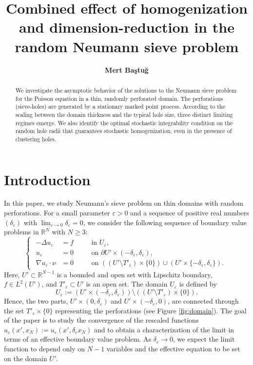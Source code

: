 \documentclass{article}
\title{\textbf{Combined effect of homogenization and dimension-reduction in the random Neumann sieve problem}}
\author{\textbf{Mert Baştuğ}}
\date{}
\numberwithin{equation}{section}
\theoremstyle{definition}
\theoremstyle{remark}
\begin{document}
\maketitle

\begin{abstract}
    We investigate the asymptotic behavior of the solutions to the Neumann sieve problem for the Poisson equation in a thin, randomly perforated domain. The perforations (sieve-holes) are generated by a stationary marked point process. According to the scaling between the domain thickness and the typical hole size, three distinct limiting regimes emerge. We also identify the optimal stochastic integrability condition on the random hole radii that guarantees stochastic homogenization, even in the presence of clustering holes.
\end{abstract}

\section{Introduction}

In this paper, we study Neumann's sieve problem on thin domains with random perforations. For a small parameter $\varepsilon > 0$ and a sequence of positive real numbers $(\delta_\varepsilon)$ with $\lim_{\varepsilon \to 0} \delta_\varepsilon = 0$, we consider the following sequence of boundary value problems in $\mathbb{R}^N$ with $N \ge 3$:
\begin{equation}
    \begin{cases}
        \begin{alignedat}{2} \label{eq:random_bvp}
            -\Delta u_\varepsilon &= f \quad && \text{in } U_\varepsilon, \\
            u_\varepsilon &= 0 \quad && \text{on } \partial U' \times (-\delta_\varepsilon, \delta_\varepsilon), \\
            \nabla u_\varepsilon \cdot \nu &= 0 \quad && \text{on } ((U' \setminus T'_\varepsilon) \times \{0\}) \cup (U' \times \{-\delta_\varepsilon, \delta_\varepsilon\}).
        \end{alignedat}
    \end{cases}
\end{equation}
Here, $U' \subset \mathbb{R}^{N - 1}$ is a bounded and open set with Lipschitz boundary, $f \in L^2(U')$, and $T'_\varepsilon \subset U'$ is an open set. The domain $U_\varepsilon$ is defined by
\[
U_\varepsilon := (U' \times (-\delta_\varepsilon, \delta_\varepsilon)) \setminus ((U' \setminus T'_\varepsilon) \times \{0\}).
\]
Hence, the two parts, $U' \times (0, \delta_\varepsilon)$ and $U' \times (-\delta_\varepsilon, 0)$, are connected through the set $T'_\varepsilon \times \{0\}$ representing the perforations (see Figure \ref{fig:domain}). The goal of the paper is to study the convergence of the rescaled functions $\hat{u}_\varepsilon(x', x_N) := u_\varepsilon(x', \delta_\varepsilon x_N)$ and to obtain a characterization of the limit in terms of an effective boundary value problem. As $\delta_\varepsilon \to 0$, we expect the limit function to depend only on $N - 1$ variables and the effective equation to be set on the domain $U'$.
\end{document}
